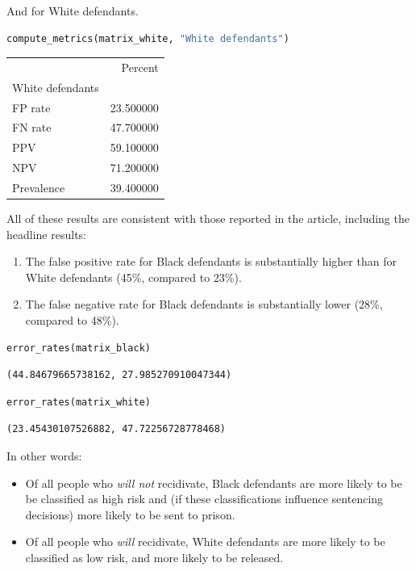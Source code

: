 And for White defendants.

\begin{lstlisting}[language=Python,style=source]
compute_metrics(matrix_white, "White defendants")
\end{lstlisting}

\begin{tabular}{lr}
\midrule
 & Percent \\
White defendants &  \\
\midrule
FP rate & 23.500000 \\
FN rate & 47.700000 \\
PPV & 59.100000 \\
NPV & 71.200000 \\
Prevalence & 39.400000 \\
\midrule
\end{tabular}

All of these results are consistent with those reported in the article,
including the headline results:

\begin{enumerate}
\def\labelenumi{\arabic{enumi}.}
\item
  The false positive rate for Black defendants is substantially higher
  than for White defendants (45\%, compared to 23\%).
\item
  The false negative rate for Black defendants is substantially lower
  (28\%, compared to 48\%).
\end{enumerate}

\begin{lstlisting}[language=Python,style=source]
error_rates(matrix_black)
\end{lstlisting}

\begin{lstlisting}[style=output]
(44.84679665738162, 27.985270910047344)
\end{lstlisting}

\begin{lstlisting}[language=Python,style=source]
error_rates(matrix_white)
\end{lstlisting}

\begin{lstlisting}[style=output]
(23.45430107526882, 47.72256728778468)
\end{lstlisting}

In other words:

\begin{itemize}
\item
  Of all people who \emph{will not} recidivate, Black defendants are
  more likely to be be classified as high risk and (if these
  classifications influence sentencing decisions) more likely to be sent
  to prison.
\item
  Of all people who \emph{will} recidivate, White defendants are more
  likely to be classified as low risk, and more likely to be released.
\end{itemize}

